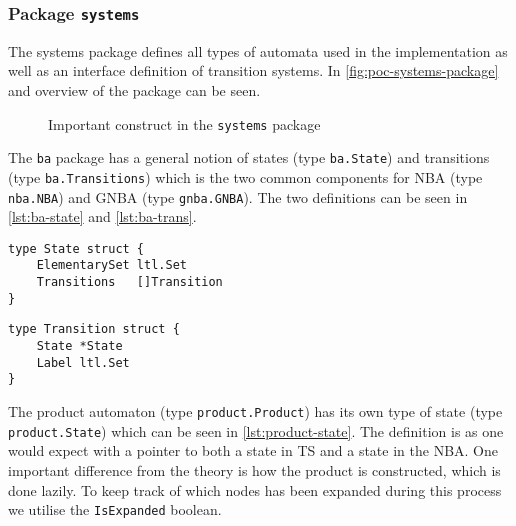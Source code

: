 \subsubsection{Package \texttt{systems}}
The systems package defines all types of automata used in the implementation as well as an interface definition of transition systems. In \autoref{fig:poc-systems-package} and overview of the package can be seen.
\begin{figure}
    \caption{Important construct in the \texttt{systems} package}
    \label{fig:poc-systems-package}
\end{figure}
The \verb=ba= package has a general notion of states (type \verb=ba.State=) and transitions (type \verb=ba.Transitions=) which is the two common components for NBA (type \verb=nba.NBA=) and GNBA (type \verb=gnba.GNBA=). The two definitions can be seen in \autoref{lst:ba-state} and \autoref{lst:ba-trans}.


\begin{lstlisting}[language=Golang, caption={Definition of \texttt{ba.State}}, label={lst:ba-state}, floatplacement=H]
type State struct {
    ElementarySet ltl.Set
    Transitions   []Transition
}
\end{lstlisting}

\begin{lstlisting}[language=Golang, caption={Definition of \texttt{ba.Transition}}, label={lst:ba-trans}, floatplacement=H]
type Transition struct {
    State *State
    Label ltl.Set
}
\end{lstlisting}

The product automaton (type \verb=product.Product=) has its own type of state (type \verb=product.State=) which can be seen in \autoref{lst:product-state}. The definition is as one would expect with a pointer to both a state in TS and a state in the NBA. One important difference from the theory is how the product is constructed, which is done lazily. To keep track of which nodes has been expanded during this process we utilise the \verb=IsExpanded= boolean. 


